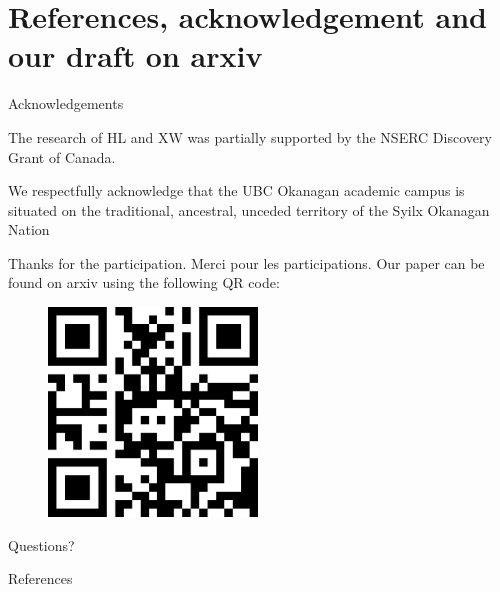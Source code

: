 \documentclass[11pt]{beamer}
\theoremstyle{definition}
\begin{document}
\section{References, acknowledgement and our draft on arxiv}
    \begin{frame}{Acknowledgements}
        \begin{tcolorbox}
            The research of HL and XW was partially supported by the NSERC Discovery Grant of Canada.
            \par
            We respectfully acknowledge that the UBC Okanagan academic campus is situated on the traditional, ancestral, unceded territory of the Syilx Okanagan Nation    
        \end{tcolorbox}
    \end{frame}
    \begin{frame}{Thanks for the participation. Merci pour les participations.}
        Our paper can be found on arxiv using the following QR code: 
        \begin{figure}
            \centering
            \includegraphics[width=15em]{assets/paper-qrcode.png}
        \end{figure}
        Questions?
    \end{frame}
    \begin{frame}{References}        
        
    \end{frame}
\end{document}
